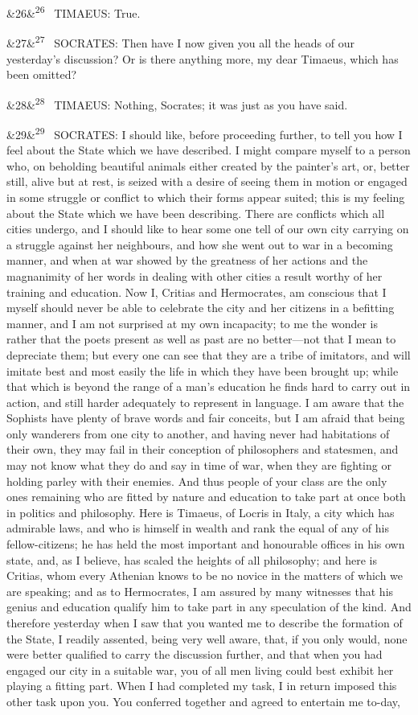\documentclass[12pt]{article}
\newcommand{\para}[1][]{\par\noindent\ifx&#1&\else\textsuperscript{\footnotesize #1}~\fi}
\begin{document}
\para[26] TIMAEUS: True.

\para[27] SOCRATES: Then have I now given you all the heads of our yesterday's discussion? Or is there anything more, my dear Timaeus, which has been omitted?

\para[28] TIMAEUS: Nothing, Socrates; it was just as you have said.

\para[29] SOCRATES: I should like, before proceeding further, to tell you how I feel about the State which we have described. I might compare myself to a person who, on beholding beautiful animals either created by the painter's art, or, better still, alive but at rest, is seized with a desire of seeing them in motion or engaged in some struggle or conflict to which their forms appear suited; this is my feeling about the State which we have been describing. There are conflicts which all cities undergo, and I should like to hear some one tell of our own city carrying on a struggle against her neighbours, and how she went out to war in a becoming manner, and when at war showed by the greatness of her actions and the magnanimity of her words in dealing with other cities a result worthy of her training and education. Now I, Critias and Hermocrates, am conscious that I myself should never be able to celebrate the city and her citizens in a befitting manner, and I am not surprised at my own incapacity; to me the wonder is rather that the poets present as well as past are no better---not that I mean to depreciate them; but every one can see that they are a tribe of imitators, and will imitate best and most easily the life in which they have been brought up; while that which is beyond the range of a man's education he finds hard to carry out in action, and still harder adequately to represent in language. I am aware that the Sophists have plenty of brave words and fair conceits, but I am afraid that being only wanderers from one city to another, and having never had habitations of their own, they may fail in their conception of philosophers and statesmen, and may not know what they do and say in time of war, when they are fighting or holding parley with their enemies. And thus people of your class are the only ones remaining who are fitted by nature and education to take part at once both in politics and philosophy. Here is Timaeus, of Locris in Italy, a city which has admirable laws, and who is himself in wealth and rank the equal of any of his fellow-citizens; he has held the most important and honourable offices in his own state, and, as I believe, has scaled the heights of all philosophy; and here is Critias, whom every Athenian knows to be no novice in the matters of which we are speaking; and as to Hermocrates, I am assured by many witnesses that his genius and education qualify him to take part in any speculation of the kind. And therefore yesterday when I saw that you wanted me to describe the formation of the State, I readily assented, being very well aware, that, if you only would, none were better qualified to carry the discussion further, and that when you had engaged our city in a suitable war, you of all men living could best exhibit her playing a fitting part. When I had completed my task, I in return imposed this other task upon you. You conferred together and agreed to entertain me to-day, 
\end{document}
